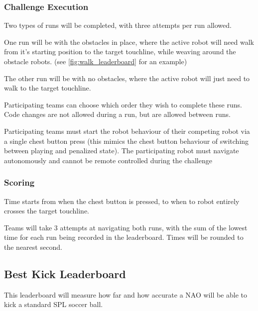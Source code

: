 \subsubsection{Challenge Execution}
Two types of runs will be completed, with three attempts per run allowed.

One run will be with the obstacles in place, where the active robot will need walk from it's
starting position to the target touchline, while weaving around the obstacle robots. (see \cref{fig:walk_leaderboard} for an example)

The other run will be with no obstacles, where the active robot will just need to walk 
to the target touchline.

Participating teams can choose which order they wish to complete these runs. Code changes are not allowed during a run,
but are allowed between runs.

Participating teams must start the robot behaviour of their competing robot via a single chest button
press (this mimics the chest button behaviour of switching between playing and penalized state).
The participating robot must navigate autonomously and cannot be remote controlled during the challenge

\subsubsection{Scoring}
Time starts from when the chest button is pressed, to when to robot entirely crosses the target touchline.

Teams will take 3 attempts at navigating both runs, with the sum of the lowest time for each
run being recorded in the leaderboard. Times will be rounded to the nearest second.

\subsection{Best Kick Leaderboard}
This leaderboard will measure how far and how accurate a NAO will be able to kick a standard
SPL soccer ball.

